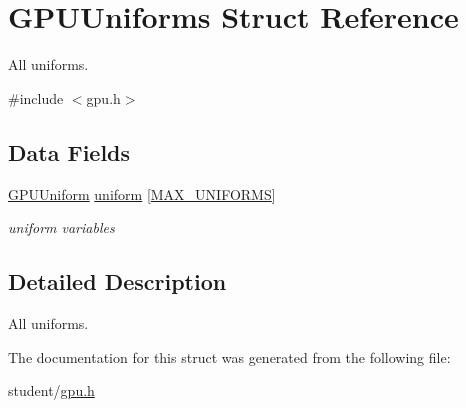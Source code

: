\hypertarget{structGPUUniforms}{}\section{G\+P\+U\+Uniforms Struct Reference}
\label{structGPUUniforms}


All uniforms.  




{\ttfamily \#include $<$gpu.\+h$>$}

\subsection*{Data Fields}
\begin{DoxyCompactItemize}
\item 
\mbox{\label{structGPUUniforms_aa49800f649bb2566b817383b2fcac114}} 
\hyperlink{structGPUUniform}{G\+P\+U\+Uniform} \hyperlink{structGPUUniforms_aa49800f649bb2566b817383b2fcac114}{uniform} \mbox{[}\hyperlink{gpu_8h_a4d68c6261a34b0ebce406bd262042e12}{M\+A\+X\+\_\+\+U\+N\+I\+F\+O\+R\+MS}\mbox{]}
\begin{DoxyCompactList}\small\item\em uniform variables \end{DoxyCompactList}\end{DoxyCompactItemize}


\subsection{Detailed Description}
All uniforms. 

The documentation for this struct was generated from the following file\+:\begin{DoxyCompactItemize}
\item 
student/\hyperlink{gpu_8h}{gpu.\+h}\end{DoxyCompactItemize}
